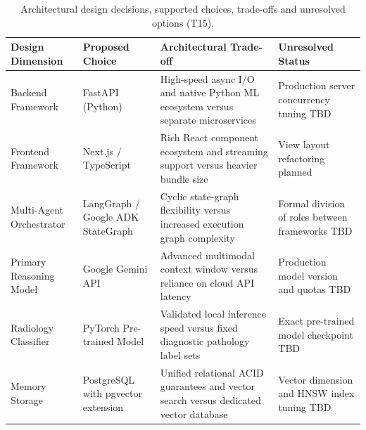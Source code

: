 \begin{table}[htbp]
\centering
\small
\caption{Architectural design decisions, supported choices, trade-offs and unresolved options (T15).}
\label{tab:esha:decisions}
\begin{tabular}{|p{}|p{}|p{}|p{}|}
\hline
Design Dimension & Proposed Choice & Architectural Trade-off & Unresolved Status \\ \hline
Backend Framework & FastAPI (Python) & High-speed async I/O and native Python ML ecosystem versus separate microservices & Production server concurrency tuning TBD \\ \hline
Frontend Framework & Next.js / TypeScript & Rich React component ecosystem and streaming support versus heavier bundle size & View layout refactoring planned \\ \hline
Multi-Agent Orchestrator & LangGraph / Google ADK StateGraph & Cyclic state-graph flexibility versus increased execution graph complexity & Formal division of roles between frameworks TBD \\ \hline
Primary Reasoning Model & Google Gemini API & Advanced multimodal context window versus reliance on cloud API latency & Production model version and quotas TBD \\ \hline
Radiology Classifier & PyTorch Pre-trained Model & Validated local inference speed versus fixed diagnostic pathology label sets & Exact pre-trained model checkpoint TBD \\ \hline
Memory Storage & PostgreSQL with pgvector extension & Unified relational ACID guarantees and vector search versus dedicated vector database & Vector dimension and HNSW index tuning TBD \\ \hline
\end{tabular}
\end{table}

